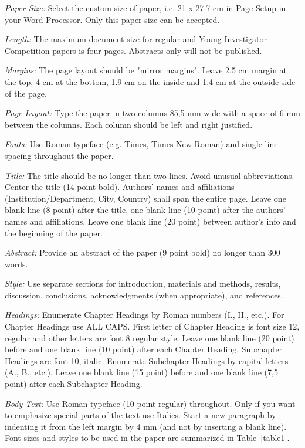 \documentclass[nouppercase]{ifmbe}
\begin{document}
\textit{Paper Size:} Select the custom size of paper, i.e. 21 x 27.7 cm
in Page Setup in your Word Processor. Only this paper size can be
accepted.

\textit{Length:} The maximum document size for regular and Young
Investigator Competition papers is four pages. Abstracts only will not
be published.

\textit{Margins:} The page layout should be "mirror margins". Leave 2.5
cm margin at the top, 4 cm at the bottom, 1.9 cm on the inside and 1.4
cm at the outside side of the page.

\textit{Page Layout:} Type the paper in two columns 85,5 mm wide with a
space of 6 mm between the columns. Each column should be left and right
justified.

\textit{Fonts:} Use Roman typeface (e.g. Times, Times New Roman) and
single line spacing throughout the paper.

\textit{Title:} The title should be no longer than two lines. Avoid
unusual abbreviations. Center the title (14 point bold). Authors' names
and affiliations (Institution/Department, City, Country) shall span the
entire page. Leave one blank line (8 point) after the title, one blank
line (10 point) after the authors' names and affiliations. Leave one
blank line (20 point) between author's info and the beginning of the
paper.

\textit{Abstract:} Provide an abstract of the paper (9 point bold) no
longer than 300 words.

\textit{Style:} Use separate sections for introduction, materials and
methods, results, discussion, conclusions, acknowledgments (when
appropriate), and references.

\textit{Headings:} Enumerate Chapter Headings by Roman numbers (I., II.,
etc.). For Chapter Headings use ALL CAPS. First letter of Chapter
Heading is font size 12, regular and other letters are font 8 regular
style. Leave one blank line (20 point) before and one blank line (10
point) after each Chapter Heading. Subchapter Headings are font 10,
italic. Enumerate Subchapter Headings by capital letters (A., B., etc.).
Leave one blank line (15 point) before and one blank line (7,5 point)
after each Subchapter Heading.

\textit{Body Text:} Use Roman typeface (10 point regular) throughout.
Only if you want to emphasize special parts of the text use Italics.
Start a new paragraph by indenting it from the left margin by 4 mm (and
not by inserting a blank line). Font sizes and styles to be used in the
paper are summarized in Table~\ref{table1}.
\end{document}
